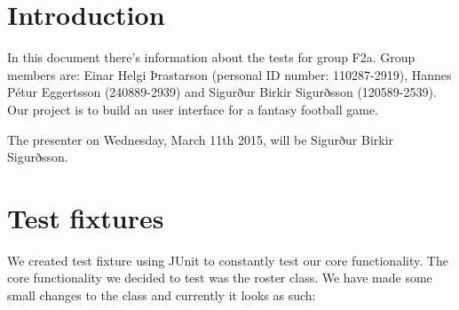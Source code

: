 \documentclass{article}
\begin{document}
\section{Introduction}
In this document there's information about the tests for group F2a. Group members are: Einar Helgi Þrastarson (personal ID number: 110287-2919), Hannes Pétur Eggertsson (240889-2939) and Sigurður Birkir Sigurðsson (120589-2539). Our project is to build an user interface for a fantasy football game.

The presenter on Wednesday, March 11th 2015, will be Sigurður Birkir Sigurðsson.

\section{Test fixtures}
We created test fixture using JUnit to constantly test our core functionality. The core functionality we decided to test was the roster class. We have made some small changes to the class and currently it looks as such:
\end{document}
